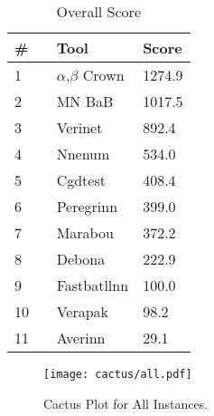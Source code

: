 

\begin{table}[h]
\begin{center}
\caption{Overall Score} \label{tab:score}
{\setlength{\tabcolsep}{2pt}
\begin{tabular}[h]{@{}lll@{}}
\toprule
\textbf{\# ~} & \textbf{Tool} & \textbf{Score}\\
\midrule
1 & $\alpha$,$\beta$ Crown & 1274.9 \\
2 & MN BaB & 1017.5 \\
3 & Verinet & 892.4 \\
4 & Nnenum & 534.0 \\
5 & Cgdtest & 408.4 \\
6 & Peregrinn & 399.0 \\
7 & Marabou & 372.2 \\
8 & Debona & 222.9 \\
9 & Fastbatllnn & 100.0 \\
10 & Verapak & 98.2 \\
11 & Averinn & 29.1 \\
\bottomrule
\end{tabular}
}
\end{center}
\end{table}



\begin{figure}[h]
\centerline{\texttt{[image: cactus/all.pdf]}}
\caption{Cactus Plot for All Instances.}
\label{fig:quantPic}
\end{figure}

